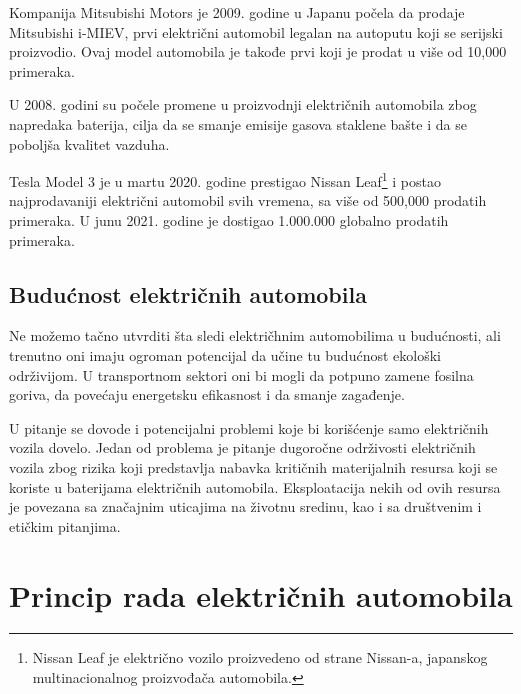 \documentclass[a4paper]{article}
\begin{document}
Kompanija Mitsubishi Motors je 2009. godine u Japanu počela da prodaje Mitsubishi i-MIEV, prvi električni automobil legalan na autoputu koji se serijski proizvodio. Ovaj model automobila je takođe prvi koji je prodat u više od 10,000 primeraka.

U 2008. godini su počele promene u proizvodnji električnih automobila zbog napredaka baterija, cilja da se smanje emisije gasova staklene bašte i da se poboljša kvalitet vazduha.

Tesla Model 3 je u martu 2020. godine prestigao Nissan Leaf\footnote{Nissan Leaf je električno vozilo proizvedeno od strane Nissan-a, japanskog multinacionalnog proizvođača automobila.} i postao najprodavaniji električni automobil svih vremena, sa više od 500,000 prodatih primeraka. U junu 2021. godine je dostigao 1.000.000 globalno prodatih primeraka.


\subsection{Budućnost električnih automobila}
\label{subsec:podnaslov3}


Ne možemo tačno utvrditi šta sledi električhnim automobilima u budućnosti, ali trenutno oni imaju ogroman potencijal da učine tu budućnost ekološki održivijom. U transportnom sektori oni bi mogli da potpuno zamene fosilna goriva, da povećaju energetsku efikasnost i da smanje zagađenje.

U pitanje se dovode i potencijalni problemi koje bi korišćenje samo električnih vozila dovelo. Jedan od problema je pitanje dugoročne održivosti električnih vozila zbog rizika koji predstavlja nabavka kritičnih materijalnih resursa koji se koriste u baterijama električnih automobila. Eksploatacija nekih od ovih resursa je povezana sa značajnim uticajima na životnu sredinu, kao i sa društvenim i etičkim pitanjima. 

\section{Princip rada električnih automobila\vspace{2ex}}
\end{document}
